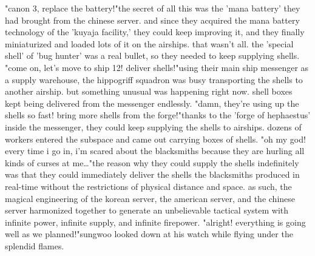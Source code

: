 "canon 3, replace the battery!"the secret of all this was the 'mana battery' they had brought from the chinese server.
 and since they acquired the mana battery technology of the 'kuyaja facility,' they could keep improving it, and they finally miniaturized and loaded lots of it on the airships.
that wasn't all.
 the 'special shell' of 'bug hunter' was a real bullet, so they needed to keep supplying shells.
"come on, let's move to ship 12! deliver shells!"using their main ship messenger as a supply warehouse, the hippogriff squadron was busy transporting the shells to another airship.
but something unusual was happening right now.
 shell boxes kept being delivered from the messenger endlessly.
"damn, they're using up the shells so fast! bring more shells from the forge!"thanks to the 'forge of hephaestus' inside the messenger, they could keep supplying the shells to airships.
dozens of workers entered the subspace and came out carrying boxes of shells.
"oh my god! every time i go in, i'm scared about the blacksmiths because they are hurling all kinds of curses at me…"the reason why they could supply the shells indefinitely was that they could immediately deliver the shells the blacksmiths produced in real-time without the restrictions of physical distance and space.
 as such, the magical engineering of the korean server, the american server, and the chinese server harmonized together to generate an unbelievable tactical system with infinite power, infinite supply, and infinite firepower.
"alright! everything is going well as we planned!"sungwoo looked down at his watch while flying under the splendid flames.

